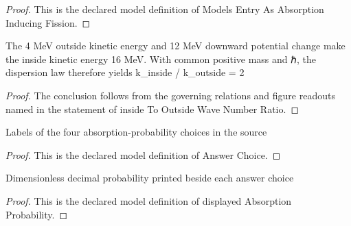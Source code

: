 \begin{proof}
  This is the declared model definition of Models Entry As Absorption Inducing Fission.
\end{proof}
\begin{lemma}
  \label{lem:physics:phyx-mini-0600:phyxminiproblems-problemphyxmini0600-insidetooutsidewavenumberratio}
  The 4 MeV outside kinetic energy and 12 MeV downward potential change make the inside kinetic energy 16 MeV. With common positive mass and ℏ, the dispersion law therefore yields k\_inside / k\_outside = 2
\end{lemma}
\begin{proof}
  The conclusion follows from the governing relations and figure readouts named in the statement of inside To Outside Wave Number Ratio.
\end{proof}
\begin{definition}
  \label{def:physics:phyx-mini-0600:phyxminiproblems-problemphyxmini0600-answerchoice}
  Labels of the four absorption-probability choices in the source
\end{definition}
\begin{proof}
  This is the declared model definition of Answer Choice.
\end{proof}
\begin{definition}
  \label{def:physics:phyx-mini-0600:phyxminiproblems-problemphyxmini0600-displayedabsorptionprobability}
  Dimensionless decimal probability printed beside each answer choice
\end{definition}
\begin{proof}
  This is the declared model definition of displayed Absorption Probability.
\end{proof}
